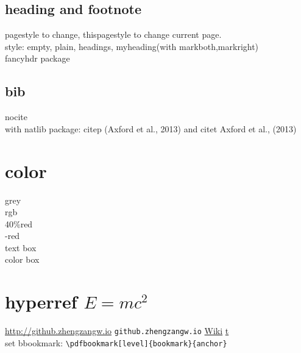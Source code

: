 \documentclass{article}
\begin{document}
\subsection{heading and footnote}
    pagestyle to change, thispagestyle to change current page.\\
    style: empty, plain, headings, myheading(with markboth,markright)\\
    fancyhdr package

\subsection{bib}
    nocite\\
    with natlib package: citep (Axford et al., 2013) and citet Axford et al., (2013)

\section{color}
    \color[gray]{0.6} grey\\
    \color[rgb]{0,1,1} rgb\\
    \color{red!40} 40\%red\\
    \color{-red} -red\\
    \textcolor{blue!50!black}{text box}\\
    \colorbox[gray]{0.95}{color box}
    \color{black}

\section{hyperref \texorpdfstring{$E=mc^2$}{E=mc\textasciicircum 2}}
    \url{http://github.zhengzangw.io}\label{t}
    \nolinkurl{github.zhengzangw.io}
    \href{http://wikipedia.org}{Wiki}
    \hyperref[t]{t}\\
    set bbookmark: \verb|\pdfbookmark[level]{bookmark}{anchor}|
\end{document}

